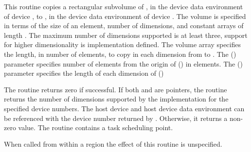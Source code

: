 \begin{ccppspecific}
This routine copies a rectangular subvolume of ,
in the device data environment of device ,
to , in the device data environment of device .
The volume is specified in terms of the size of an element, 
number of dimensions, and constant arrays of length .  The 
maximum number of dimensions supported is at least three, support for higher 
dimensionality is implementation defined. The volume array specifies the 
length, in number of elements, to copy in each dimension from  
to . The  () parameter specifies
number of elements from the origin of  () in elements.  
The  () parameter specifies the 
length of each dimension of  ()

The routine returns zero if successful. If both  and  are
 pointers, the routine returns the number of dimensions supported
by the implementation for the specified device numbers. The host device and
host device data environment can be referenced with the device number returned
by .  Otherwise, it returns a non-zero value. The
routine contains a task scheduling point.

When called from within a  region 
the effect of this routine is unspecified.


\begin{figure}[t!]
\end{figure}


\end{ccppspecific}
